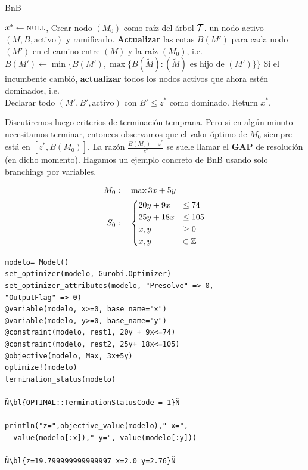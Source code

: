     
    \begin{algorithm}[H]
    	\caption{BnB}
    	\label{alg:bnb}
    	\begin{algorithmic}[1]
    		\State $x^*\gets \textsc{null}$, Crear nodo $(M_0)$ como raíz del árbol $\mathcal T$.
    		 un nodo activo $(M,B,\text{activo})$ y ramificarlo.
    		\State \textbf{Actualizar} las cotas $B(M')$ para cada nodo $(M')$ en el camino entre $(M)$ y la raíz $(M_0)$, i.e.\\
    		\qquad \qquad $B(M')\gets \min\{B(M'), \max\{B(\tilde{M})\colon (\tilde{M}) \text{ es hijo de } (M')\}\}$
    		\State Si el incumbente cambió, \textbf{actualizar} todos los nodos activos que ahora estén dominados, i.e.\\
    		\qquad \qquad Declarar todo $(M',B',\text{activo})$ con $B'\leq z^*$ como dominado.
    		\EndWhile
    		\State Return $x^*$.
    	\end{algorithmic}
    \end{algorithm} 
    
    Discutiremos luego criterios de terminación temprana. Pero si en algún minuto necesitamos terminar, entonces observamos que el valor óptimo de $M_0$ siempre está en $[z^*, B(M_0)]$. La razón $\frac{B(M_0)-z^*}{z^*}$ se suele llamar el \textbf{GAP} de resolución (en dicho momento). Hagamos un ejemplo concreto de BnB usando solo branchings por variables.    
    
    \begin{minipage}{0.3\textwidth}
    \begin{align*}
    M_0&:\quad 	\max 3x+5y\\
    S_0&:\quad \begin{cases}
    20y+9x&\leq 74\\
    25y+18x&\leq 105\\
    x,y&\geq 0\\
    x,y&\in \mathbb Z
    \end{cases}
    \end{align*}
    	\end{minipage}		
    \begin{minipage}{0.7\textwidth}
    

 	\begin{lstlisting}[escapechar=Ñ]
modelo= Model()
set_optimizer(modelo, Gurobi.Optimizer)
set_optimizer_attributes(modelo, "Presolve" => 0,
"OutputFlag" => 0) 
@variable(modelo, x>=0, base_name="x")
@variable(modelo, y>=0, base_name="y")
@constraint(modelo, rest1, 20y + 9x<=74)
@constraint(modelo, rest2, 25y+ 18x<=105)
@objective(modelo, Max, 3x+5y)
optimize!(modelo)
termination_status(modelo)

Ñ\bl{OPTIMAL::TerminationStatusCode = 1}Ñ

println("z=",objective_value(modelo)," x=",
  value(modelo[:x])," y=", value(modelo[:y]))

Ñ\bl{z=19.799999999999997 x=2.0 y=2.76}Ñ
    	\end{lstlisting}
    \end{minipage}
    
